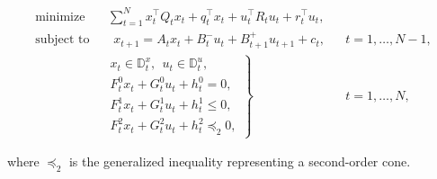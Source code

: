 \documentclass[letterpaper,11pt]{article}
\begin{document}
\begin{align*}
    \operatorname{minimize}~~&~\sum_{t=1}^Nx_t^\top Q_t x_t +q_t^\top x_t + u_t^\top R_t u_t + r_t^\top u_t,\\
    \operatorname{subject~to}~~&~~~x_{t+1} = A_t x_t + B_t^{-}u_t + B_{t+1}^+u_{t+1} + c_t, & & t = 1,\ldots,N-1,\\
        & \left. \begin{array}{l} 
        x_t\in\mathbb{D}^x_t,~~u_t \in \mathbb{D}^u_t,\\[0.1cm]
        F^0_t x_t + G^0_t u_t + h^0_t = 0, \\[0.1cm]
        F^1_t x_t + G^1_t u_t + h^1_t \le 0, \\[0.1cm]
        F^2_t x_t + G^2_t u_t + h^2_t \preceq_{2} 0 , \end{array} \right\} & & t = 1,\ldots, N,  
\end{align*}

where $\preceq_2$ is the generalized inequality representing a second-order cone.
\end{document}
